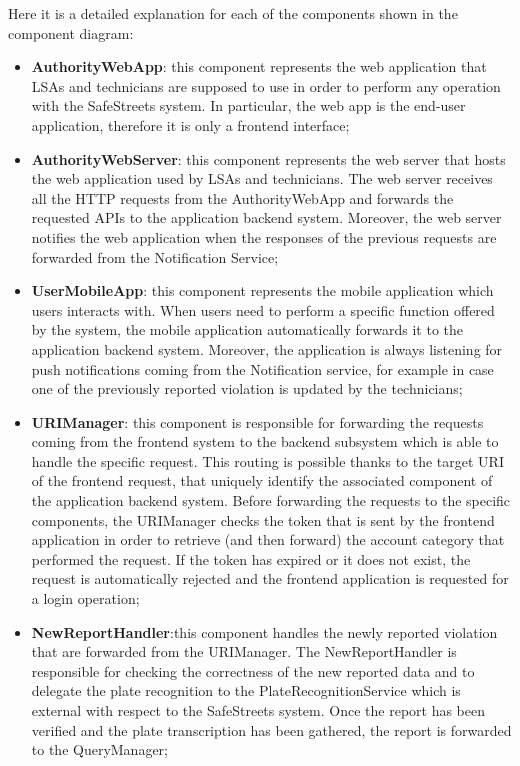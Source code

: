 Here it is a detailed explanation for each of the components shown in the component diagram:
\begin{itemize}%
    \item \textbf{AuthorityWebApp}: this component represents the web application that LSAs and technicians are supposed to use in order to perform any operation with the SafeStreets system. In particular, the web app is the end-user application, therefore it is only a frontend interface;
    \item \textbf{AuthorityWebServer}: this component represents the web server that hosts the web application used by LSAs and technicians. The web server receives all the HTTP requests from the AuthorityWebApp and forwards the requested APIs to the application backend system. Moreover, the web server notifies the web application when the responses of the previous requests are forwarded from the Notification Service;
    \item \textbf{UserMobileApp}: this component represents the mobile application which users interacts with. When users need to perform a specific function offered by the system, the mobile application automatically forwards it to the application backend system. Moreover, the application is always listening for push notifications coming from the Notification service, for example in case one of the previously reported violation is updated by the technicians;
    \item \textbf{URIManager}: this component is responsible for forwarding the requests coming from the frontend system to the backend subsystem which is able to handle the specific request. This routing is possible thanks to the target URI of the frontend request, that uniquely identify the associated component of the application backend system. Before forwarding the requests to the specific components, the URIManager checks the token that is sent by the frontend application in order to retrieve (and then forward) the account category that performed the request. If the token has expired or it does not exist, the request is automatically rejected and the frontend application is requested for a login operation;
    \item \textbf{NewReportHandler}:this component handles the newly reported violation that are forwarded from the URIManager. The NewReportHandler is responsible for checking the correctness of the new reported data and to delegate the plate recognition to the PlateRecognitionService which is external with respect to the SafeStreets system. Once the report has been verified and the plate transcription has been gathered, the report is forwarded to the QueryManager;

\end{itemize}
